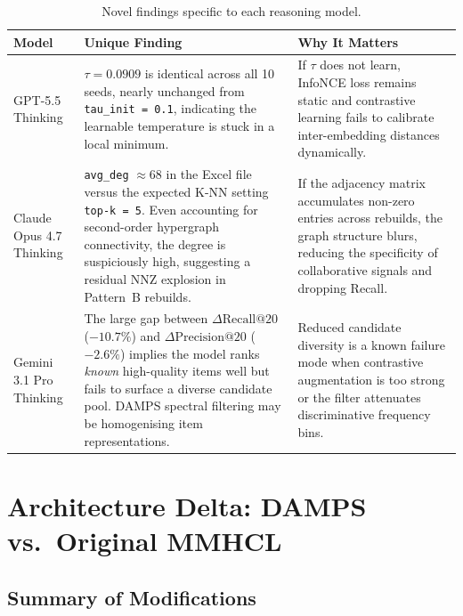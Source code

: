 \documentclass[12pt,a4paper]{article}
\begin{document}
\begin{table}[htbp]
\centering
\caption{Novel findings specific to each reasoning model.}
\label{tab:unique}
\begin{tabular}{|>{\raggedright\arraybackslash}p{2.5cm}|
                >{\raggedright\arraybackslash}p{5.5cm}|
                >{\raggedright\arraybackslash}p{5.0cm}|}
\hline
\rowcolor{tabhead}\textbf{Model} & \textbf{Unique Finding} & \textbf{Why It Matters} \\
\hline
GPT-5.5 Thinking
  & $\tau = 0.0909$ is identical across all 10 seeds, nearly unchanged
    from \texttt{tau\_init = 0.1}, indicating the learnable temperature
    is stuck in a local minimum.
  & If $\tau$ does not learn, InfoNCE loss remains static and contrastive
    learning fails to calibrate inter-embedding distances dynamically. \\\hline

Claude Opus 4.7 Thinking
  & \texttt{avg\_deg} $\approx 68$ in the Excel file versus the
    expected K-NN setting \texttt{top-k = 5}.  Even accounting for
    second-order hypergraph connectivity, the degree is suspiciously
    high, suggesting a residual NNZ explosion in Pattern~B rebuilds.
  & If the adjacency matrix accumulates non-zero entries across
    rebuilds, the graph structure blurs, reducing the specificity of
    collaborative signals and dropping Recall. \\\hline

Gemini 3.1 Pro Thinking
  & The large gap between $\Delta\text{Recall@20}$ ($-10.7\%$) and
    $\Delta\text{Precision@20}$ ($-2.6\%$) implies the model ranks
    \emph{known} high-quality items well but fails to surface a diverse
    candidate pool.  DAMPS spectral filtering may be homogenising item
    representations. &
    Reduced candidate diversity is a known failure mode when contrastive
    augmentation is too strong or the filter attenuates discriminative
    frequency bins. \\\hline
\end{tabular}
\end{table}

\section{Architecture Delta: DAMPS vs.\ Original MMHCL}

\subsection{Summary of Modifications}
\end{document}
